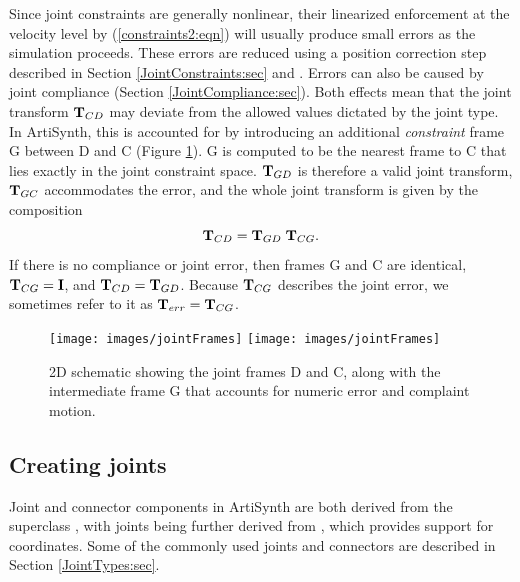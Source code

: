 Since joint constraints are generally nonlinear, their linearized
enforcement at the velocity level by (\ref{constraints2:eqn}) will
usually produce small errors as the simulation proceeds.  These errors
are reduced using a position correction step described in
Section \ref{JointConstraints:sec} and \cite{lloyd2012artisynth}.
Errors can also be caused by joint compliance
(Section \ref{JointCompliance:sec}).  Both effects mean that the joint
transform ${\bf T}_{CD}$ may deviate from the allowed values dictated by
the joint type. In ArtiSynth, this is accounted for by introducing an
additional {\it constraint} frame G between D and C
(Figure \ref{jointFrames:fig}).  G is computed to be the nearest frame
to C that lies exactly in the joint constraint space. ${\bf T}_{GD}$ is
therefore a valid joint transform, ${\bf T}_{GC}$ accommodates the error,
and the whole joint transform is given by the composition
%
\begin{equation}
{\bf T}_{CD} = {\bf T}_{GD} \; {\bf T}_{CG}.
\end{equation}
%
If there is no compliance or joint error, then frames G and C are
identical, ${\bf T}_{CG} = {\bf I}$, and ${\bf T}_{CD} = {\bf T}_{GD}$.  Because ${\bf T}_{CG}$
describes the joint error, we sometimes refer to it as ${\bf T}_{err}
= {\bf T}_{CG}$.

\begin{figure}[ht]
\begin{center}
 \iflatexml
   \texttt{[image: images/jointFrames]}
 \else
   \texttt{[image: images/jointFrames]}
 \fi
\end{center}
\caption{2D schematic showing the joint frames D and C, along with
the intermediate frame G that accounts for numeric error
and complaint motion.}
\label{jointFrames:fig}
\end{figure}

\subsection{Creating joints}
\label{CreatingJoints:sec}

Joint and connector components in ArtiSynth are both derived from the
superclass
,
with joints being further derived from
,
which provides support for coordinates.  Some of the commonly used
joints and connectors are described in Section
\ref{JointTypes:sec}.

